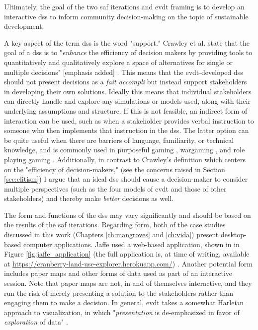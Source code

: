 Ultimately, the goal of the two \ac{saf} iterations and \ac{evdt} framing is to develop an interactive \acf{dss} to inform community decision-making on the topic of sustainable development.

A key aspect of the term \ac{dss} is the word "support." Crawley et al. state that the goal of a \ac{dss} is to "\emph{enhance} the efficiency of decision makers by providing tools to quantitatively and qualitatively explore a space of alternatives for single or multiple decisions" [emphasis added] \cite{crawleySystemArchitectureStrategy2015}. This means that the \ac{evdt}-developed \ac{dss} should not present decisions as a \textit{fait accompli} but instead support stakeholders in developing their own solutions. Ideally this means that individual stakeholders can directly handle and explore any simulations or models used, along with their underlying assumptions and structure. If this is not feasible, an indirect form of interaction can be used, such as when a stakeholder provides verbal instruction to someone who then implements that instruction in the \ac{dss}. The latter option can be quite useful when there are barriers of language, familiarity, or technical knowledge, and is commonly used in purposeful gaming \cite{rossGamebasedLearningSystems2014}, wargaming \cite{hansonImprovingOperationalWargaming2016,selvaRevitalizingWargamingNecessary15,shlapakReinforcingDeterrenceNATO2016}, and role playing gaming \cite{groganStrategicEngineeringGaming2012,groganFederatedSimulationGaming2012}. Additionally, in contrast to Crawley's definition which centers on the "efficiency of decision-makers," (see the concerns raised in Section \ref{sec:elitism}) I argue that an ideal \ac{dss} should cause a decision-maker to consider multiple perspectives (such as the four models of \ac{evdt} and those of other stakeholders) and thereby make \textit{better} decisions as well.

The form and functions of the \ac{dss} may vary significantly and should be based on the results of the \ac{saf} iterations. Regarding form, both of the case studies discussed in this work (Chapters \ref{ch:mangroves} and \ref{ch:vida}) present desktop-based computer applications. Jaffe used a web-based application, shown in in Figure \ref{fig:jaffe_application} (the full application is, at time of writing, available at \url{https://cranberry-land-use-explorer.herokuapp.com/}) \cite{jaffeEnvironmentalEconomicSystems2022}. Another potential form includes paper maps and other forms of data used as part of an interactive session. Note that paper maps are not, in and of themselves interactive, and they run the risk of merely presenting a solution to the stakeholders rather than engaging them to make a decision. In general, \ac{evdt} takes a somewhat Harleian approach to visualization, in which "\textit{presentation} is de-emphasized in favor of \textit{exploration} of data" \cite{cramptonMapsSocialConstructions2001}.

